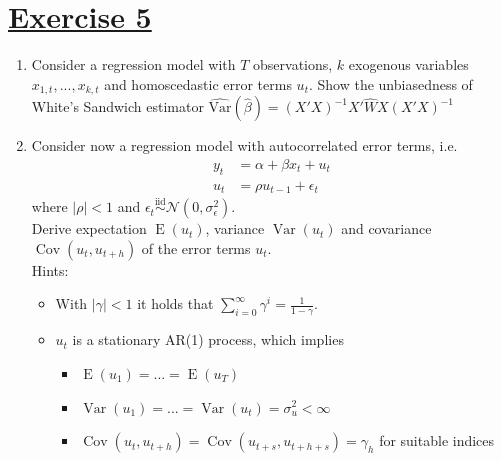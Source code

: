 \documentclass[captions=tableheading, 12pt, headings=small, parskip=half]{scrartcl}
\begin{document}
\section*{\underline{Exercise 5}}
\begin{enumerate}[label = \alph*)]
	\item Consider a regression model with $T$ observations, $k$ exogenous variables $x_{1,t}, ..., x_{k,t}$ and homoscedastic error terms $u_t$. Show the unbiasedness of White's Sandwich estimator $\widehat{\text{Var}}(\hat{\beta}) = \left(X'X\right)^{-1}X'\widehat{W}X\left(X'X\right)^{-1}$ 
	\item Consider now a regression model with autocorrelated error terms, i.e.
	\begin{align*}
		y_t &= \alpha + \beta x_t + u_t\\
		u_t &= \rho u_{t-1} + \epsilon_t
	\end{align*}
where $|\rho| < 1$ and $\epsilon_t\overset{\text{iid}}{\sim}\mathcal{N}(0, \sigma_{\epsilon}^2)$.\vspace{0.3cm}\\
Derive expectation $\operatorname{E}(u_t)$, variance $\operatorname{Var}(u_t)$ and covariance $\operatorname{Cov}(u_t, u_{t + h})$ of the error terms $u_t$. \vspace{0.3cm}\\
Hints:\\
\begin{itemize}
	\item \vspace{-0.5cm}With $|\gamma| < 1$ it holds that $\sum_{i = 0}^\infty{\gamma^i} = \frac{1}{1-\gamma}$.
	\item $u_t$ is a stationary AR(1) process, which implies
	\begin{itemize}
		\item $\operatorname{E}(u_1) = ... = \operatorname{E}(u_T)$
		\item $\operatorname{Var}(u_1) = ... = \operatorname{Var}(u_t) = \sigma_u^2 < \infty$
		\item $\operatorname{Cov}(u_t, u_{t + h}) = \operatorname{Cov}(u_{t + s}, u_{t + h + s}) = \gamma_h$ for suitable indices
	\end{itemize}
\end{itemize}
\end{enumerate}
\end{document}
